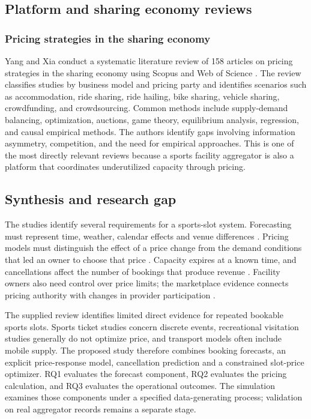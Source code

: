 \subsection{Platform and sharing economy reviews}

\subsubsection{Pricing strategies in the sharing economy}
Yang and Xia conduct a systematic literature review of 158 articles on pricing strategies in the sharing economy using Scopus and Web of Science \cite{r24}. The review classifies studies by business model and pricing party and identifies scenarios such as accommodation, ride sharing, ride hailing, bike sharing, vehicle sharing, crowdfunding, and crowdsourcing. Common methods include supply-demand balancing, optimization, auctions, game theory, equilibrium analysis, regression, and causal empirical methods. The authors identify gaps involving information asymmetry, competition, and the need for empirical approaches. This is one of the most directly relevant reviews because a sports facility aggregator is also a platform that coordinates underutilized capacity through pricing.

\subsection{Synthesis and research gap}
The studies identify several requirements for a sports-slot system. Forecasting must represent time, weather, calendar effects and venue differences \cite{r9,r15,r16,r17,r18,r19,r20,r21}. Pricing models must distinguish the effect of a price change from the demand conditions that led an owner to choose that price \cite{r2,r3,r4,r12}. Capacity expires at a known time, and cancellations affect the number of bookings that produce revenue \cite{r7,r12}. Facility owners also need control over price limits; the marketplace evidence connects pricing authority with changes in provider participation \cite{r11,r24}.

The supplied review identifies limited direct evidence for repeated bookable sports slots. Sports ticket studies concern discrete events, recreational visitation studies generally do not optimize price, and transport models often include mobile supply. The proposed study therefore combines booking forecasts, an explicit price-response model, cancellation prediction and a constrained slot-price optimizer. RQ1 evaluates the forecast component, RQ2 evaluates the pricing calculation, and RQ3 evaluates the operational outcomes. The simulation examines those components under a specified data-generating process; validation on real aggregator records remains a separate stage.
